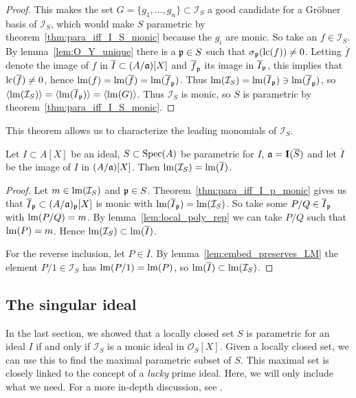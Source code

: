 \begin{proof}
  This makes the set $G = \{g_{1}, \dots, g_{n}\} \subset \mathcal I_{S}$ a good candidate for a Gröbner basis of $\mathcal I_{S}$, which would make $S$ parametric by theorem~\ref{thm:para_iff_I_S_monic} because the $g_{i}$ are monic. So take an $f \in \mathcal I_{S}$. By lemma~\ref{lem:O_Y_unique} there is a $\mathfrak p \in S$ such that $\sigma_{\mathfrak p}(\operatorname{lc}(f)) \neq 0$. Letting $\overline f$ denote the image of $f$ in $\overline I \subset (A/\mathfrak{a})[X]$ and $\overline f_{\mathfrak p}$ its image in $\overline I_{\mathfrak p}$, this implies that $\operatorname{lc}(\overline f) \neq 0$, hence $\operatorname{lm}(f) = \operatorname{lm}(\overline f) = \operatorname{lm}(\overline f_{\mathfrak p})$. Thus $\operatorname{lm}(\mathcal I_{S}) = \operatorname{lm}(\overline I_{\mathfrak p}) \ni \operatorname{lm}(\overline f_{\mathfrak p})$, so $\langle \operatorname{lm}(\mathcal I_{S}) \rangle = \langle \operatorname{lm}(\overline I_{\mathfrak p}) \rangle = \langle \operatorname{lm}(G) \rangle$. Thus $\mathcal I_{S}$ is monic, so $S$ is parametric by theorem~\ref{thm:para_iff_I_S_monic}.
\end{proof}

This theorem allows us to characterize the leading monomials of $\mathcal I_{S}$.

\begin{corollary}\label{cor:LM_I_S_eq_LM_overline_I}
  Let $I \subset A[X]$ be an ideal, $S \subset \operatorname{Spec}(A)$ be parametric for $I$, $\mathfrak{a} = \operatorname{\mathbf I}(\overline S)$ and let $\overline I$ be the image of $I$ in $(A/\mathfrak{a})[X]$. Then $\operatorname{lm}(\mathcal I_{S}) = \operatorname{lm}(\overline I)$.
\end{corollary}
\begin{proof}
  Let $m \in \operatorname{lm}(\mathcal I_{S})$ and $\mathfrak p \in S$. Theorem~\ref{thm:para_iff_I_p_monic} gives us that $\overline I_{\mathfrak p} \subset (A/\mathfrak{a})_{\mathfrak p}[X]$ is monic with $\operatorname{lm}(\overline I_{\mathfrak p}) = \operatorname{lm}(\mathcal I_{S})$. So take some $P/Q \in \overline I_{\mathfrak p}$ with $\operatorname{lm}(P/Q) = m$. By lemma~\ref{lem:local_poly_rep} we can take $P/Q$ such that $\operatorname{lm}(P) = m$. Hence $\operatorname{lm}(\mathcal I_{S}) \subset \operatorname{lm}(\overline I)$.

  For the reverse inclusion, let $P \in \overline I$. By lemma~\ref{lem:embed_preserves_LM} the element $P/1 \in \mathcal I_{S}$ has $\operatorname{lm}(P/1) = \operatorname{lm}(P)$, so $\operatorname{lm}(\overline I) \subset \operatorname{lm}(\mathcal I_{S})$.
\end{proof}















\subsection{The singular ideal}
In the last section, we showed that a locally closed set $S$ is parametric for an ideal $I$ if and only if $\mathcal I_{S}$ is a monic ideal in $\mathcal O_{S}[X]$. Given a locally closed set, we can use this to find the maximal parametric subset of $S$. This maximal set is closely linked to the concept of a \textit{lucky} prime ideal. Here, we will only include what we need. For a more in-depth discussion, see \cite{grb_covers}.

